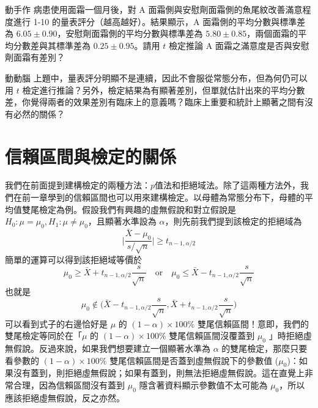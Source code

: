     \pagebreak

    \begin{custom}{動手作}
        病患使用面霜一個月後，對 A 面霜側與安慰劑面霜側的魚尾紋改善滿意程度進行 1-10 的量表評分（越高越好）。結果顯示，A 面霜側的平均分數與標準差為 $6.05 \pm 0.90$，安慰劑面霜側的平均分數與標準差為 $5.80 \pm 0.85$，兩個面霜的平均分數差與其標準差為 $0.25 \pm 0.95$。請用 $t$ 檢定推論 A 面霜之滿意度是否與安慰劑面霜有差別？
    \end{custom}

    \answerbox{250pt}

    \bigskip

    \begin{custom}{動動腦}
        上題中，量表評分明顯不是連續，因此不會服從常態分布，但為何仍可以用 $t$ 檢定進行推論？另外，檢定結果為有顯著差別，但單就估計出來的平均分數差，你覺得兩者的效果差別有臨床上的意義嗎？臨床上重要和統計上顯著之間有沒有必然的關係？
    \end{custom}

    \answerbox{160pt}

\pagebreak

\section{信賴區間與檢定的關係}
    我們在前面提到建構檢定的兩種方法：$p$值法和拒絕域法。除了這兩種方法外，我們在前一章學到的信賴區間也可以用來建構檢定。以母體為常態分布下，母體的平均值雙尾檢定為例。假設我們有興趣的虛無假說和對立假說是 $H_0: \mu = \mu_0, H_1: \mu \ne \mu_0$，且顯著水準設為 $\alpha$，則先前我們提到該檢定的拒絕域為
    \smallskip
    \[\Big|\frac{\bar{X}-\mu_0}{s/\sqrt{n}}\Big| \ge t_{n-1, \alpha/2}\]
    \smallskip
    簡單的運算可以得到該拒絕域等價於
    \smallskip
    \[\mu_0 \ge \bar{X} + t_{n-1, \alpha/2}\frac{s}{\sqrt{n}} \quad \text{or} \quad \mu_0 \le \bar{X} - t_{n-1, \alpha/2}\frac{s}{\sqrt{n}}\]
    \smallskip
    也就是
    \smallskip
    \[\mu_0 \notin \Big(\bar{X} - t_{n-1, \alpha/2}\frac{s}{\sqrt{n}}, \bar{X} + t_{n-1, \alpha/2}\frac{s}{\sqrt{n}}\Big)\]
    \smallskip
    可以看到式子的右邊恰好是 $\mu$ 的 $(1-\alpha)\times 100\%$ 雙尾信賴區間！意即，我們的雙尾檢定等同於在「$\mu$ 的 $(1-\alpha)\times 100\%$ 雙尾信賴區間沒覆蓋到 $\mu_0$ 」時拒絕虛無假說。反過來說，如果我們想要建立一個顯著水準為 $\alpha$ 的雙尾檢定，那麼只要看參數的 $(1-\alpha) \times 100\%$ 雙尾信賴區間是否蓋到虛無假說下的參數值 ($\mu_0$)：如果沒有蓋到，則拒絕虛無假說；如果有蓋到，則無法拒絕虛無假說。這在直覺上非常合理，因為信賴區間沒有蓋到 $\mu_0$ 隱含著資料顯示參數值不太可能為 $\mu_0$，所以應該拒絕虛無假說，反之亦然。

